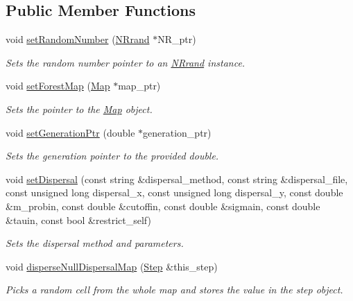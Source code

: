 \subsection*{Public Member Functions}
\begin{DoxyCompactItemize}
\item 
void \hyperlink{class_dispersal_coordinator_a3cfdb18edbf4dd1c45d0cf6af47f91fe}{set\+Random\+Number} (\hyperlink{class_n_rrand}{N\+Rrand} $\ast$N\+R\+\_\+ptr)
\begin{DoxyCompactList}\small\item\em Sets the random number pointer to an \hyperlink{class_n_rrand}{N\+Rrand} instance. \end{DoxyCompactList}\item 
void \hyperlink{class_dispersal_coordinator_a64404fec535b6589452b5c06528ac017}{set\+Forest\+Map} (\hyperlink{class_map}{Map} $\ast$map\+\_\+ptr)
\begin{DoxyCompactList}\small\item\em Sets the pointer to the \hyperlink{class_map}{Map} object. \end{DoxyCompactList}\item 
void \hyperlink{class_dispersal_coordinator_aad9a57afe4629674c958e4d0de4d2451}{set\+Generation\+Ptr} (double $\ast$generation\+\_\+ptr)
\begin{DoxyCompactList}\small\item\em Sets the generation pointer to the provided double. \end{DoxyCompactList}\item 
void \hyperlink{class_dispersal_coordinator_ab0face98d80793e7f4a8ad1bf4dfe3f1}{set\+Dispersal} (const string \&dispersal\+\_\+method, const string \&dispersal\+\_\+file, const unsigned long dispersal\+\_\+x, const unsigned long dispersal\+\_\+y, const double \&m\+\_\+probin, const double \&cutoffin, const double \&sigmain, const double \&tauin, const bool \&restrict\+\_\+self)
\begin{DoxyCompactList}\small\item\em Sets the dispersal method and parameters. \end{DoxyCompactList}\item 
void \hyperlink{class_dispersal_coordinator_a4bac3aeedb3ceb40601c3db951032d0e}{disperse\+Null\+Dispersal\+Map} (\hyperlink{struct_step}{Step} \&this\+\_\+step)
\begin{DoxyCompactList}\small\item\em Picks a random cell from the whole map and stores the value in the step object. \end{DoxyCompactList}\item 

\end{DoxyCompactItemize}
